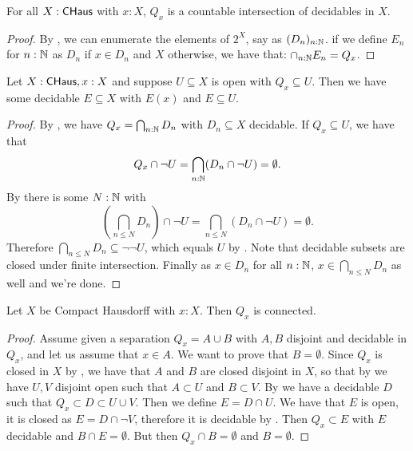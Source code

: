 \begin{lemma}\label{ConnectedComponentClosedInCompactHausdorff}
For all $X:\mathsf{CHaus}$ with $x:X$, $Q_x$ is a countable intersection of decidables in $X$.
\end{lemma}
\begin{proof}
  By ,
  we can enumerate the elements of $2^X$, say as $(D_n)_{n:\mathbb{N}}$. 
  if we define $E_n$ for $n:\mathbb{N}$ as $D_n$ if $x\in D_n$ and $X$ otherwise, we have that:
  $\cap_{n:\mathbb{N}}E_n = Q_x$.
\end{proof}
%

\begin{lemma}\label{ConnectedComponentSubOpenHasDecidableInbetween}
  Let $X:\mathsf{CHaus}, x:X$ and suppose $U\subseteq X$ is open with $Q_x\subseteq U$. 
  Then we have some decidable $E\subseteq X$ with $E(x)$ and $E\subseteq U$. 
\end{lemma}
\begin{proof}
  By , 
  we have $Q_x = \bigcap_{n:\mathbb{N}}D_n$ with $D_n\subseteq X$ decidable. 
  If $Q_x \subseteq U$, we have that 
  $$Q_x\cap \neg U = \bigcap_{n:\mathbb{N}} (D_n \cap \neg U) = \emptyset.$$
  By  there is some $N:\mathbb{N}$ with 
  $$(\bigcap_{n\leq N} D_n )\cap \neg U  = \bigcap_{n\leq N} (D_n \cap \neg U) = \emptyset.$$
  Therefore $\bigcap_{n\leq N} D_n \subseteq \neg\neg U$, which equals $U$ by .
  Note that decidable subsets are closed under finite intersection. 
  Finally as $x\in D_n$ for all $n:\mathbb{N}$, $x\in \bigcap_{n\leq N} D_n$ as well and we're done. 
\end{proof}

\begin{lemma}\label{ConnectedComponentConnected}
Let $X$ be Compact Hausdorff with $x:X$. Then $Q_x$ is connected.
\end{lemma}
\begin{proof}
Assume given a separation $Q_x = A\cup B$ with $A,B$ disjoint and decidable in $Q_x$, and let us assume that $x\in A$. 
We want to prove that $B=\emptyset$. 
%
Since $Q_x$ is closed in $X$ by , 
we have that $A$ and $B$ are closed disjoint in $X$, 
so that by  we have $U,V$ disjoint open such that $A\subset U$ and $B\subset V$. 
%
By  we have a decidable $D$ such that $Q_x\subset D\subset U\cup V$. 
Then we define $E = D\cap U$. 
We have that $E$ is open, it is closed as $E=D\cap \neg V$, therefore it is decidable by .
%
Then $Q_x\subset E$ with $E$ decidable and $B\cap E = \emptyset$. 
But then $Q_x\cap B = \emptyset$ and $B=\emptyset$.
\end{proof}

